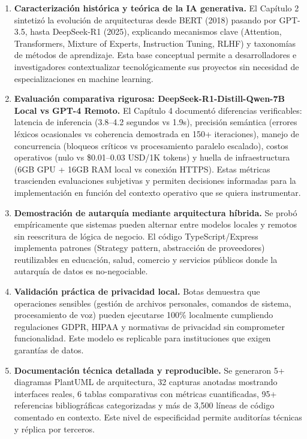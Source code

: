 \documentclass[12pt,a4paper]{report}
\numberwithin{figure}{section}
\begin{document}
\begin{enumerate}
    \item \textbf{Caracterización histórica y teórica de la IA generativa.}  
    El Capítulo 2 sintetizó la evolución de arquitecturas desde BERT (2018) pasando por GPT-3.5, hasta DeepSeek-R1 (2025), explicando mecanismos clave (Attention, Transformers, Mixture of Experts, Instruction Tuning, RLHF) y taxonomías de métodos de aprendizaje. Esta base conceptual permite a desarrolladores e investigadores contextualizar tecnológicamente sus proyectos sin necesidad de especializaciones en machine learning.

    \item \textbf{Evaluación comparativa rigurosa: DeepSeek-R1-Distill-Qwen-7B Local vs GPT-4 Remoto.}  
    El Capítulo 4 documentó diferencias verificables: latencia de inferencia (3.8--4.2 segundos vs 1.9s), precisión semántica (errores léxicos ocasionales vs coherencia demostrada en 150+ iteraciones), manejo de concurrencia (bloqueos críticos vs procesamiento paralelo escalado), costos operativos (nulo vs \$0.01--0.03 USD/1K tokens) y huella de infraestructura (6GB GPU + 16GB RAM local vs conexión HTTPS). Estas métricas trascienden evaluaciones subjetivas y permiten decisiones informadas para la implementación en función del contexto operativo que se quiera instrumentar.

    \item \textbf{Demostración de autarquía mediante arquitectura híbrida.}  
    Se probó empíricamente que sistemas pueden alternar entre modelos locales y remotos sin reescritura de lógica de negocio. El código TypeScript/Express implementa patrones (Strategy pattern, abstracción de proveedores) reutilizables en educación, salud, comercio y servicios públicos donde la autarquía de datos es no-negociable.

    \item \textbf{Validación práctica de privacidad local.}  
    Botas demuestra que operaciones sensibles (gestión de archivos personales, comandos de sistema, procesamiento de voz) pueden ejecutarse 100\% localmente cumpliendo regulaciones GDPR, HIPAA y normativas de privacidad sin comprometer funcionalidad. Este modelo es replicable para instituciones que exigen garantías de datos.

    \item \textbf{Documentación técnica detallada y reproducible.}  
    Se generaron 5+ diagramas PlantUML de arquitectura, 32 capturas anotadas mostrando interfaces reales, 6 tablas comparativas con métricas cuantificadas, 95+ referencias bibliográficas categorizadas y más de 3,500 líneas de código comentado en contexto. Este nivel de especificidad permite auditorías técnicas y réplica por terceros.
\end{enumerate}
\end{document}
